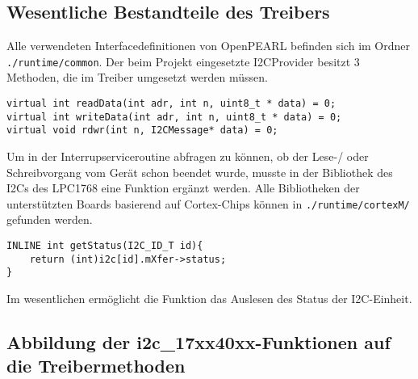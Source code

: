 \subsection{Wesentliche Bestandteile des Treibers}
Alle verwendeten Interfacedefinitionen von OpenPEARL befinden sich im Ordner \verb+./runtime/common+.
Der beim Projekt eingesetzte I2CProvider besitzt 3 Methoden, die im Treiber umgesetzt werden müssen.
\begin{verbatim}
virtual int readData(int adr, int n, uint8_t * data) = 0;
virtual int writeData(int adr, int n, uint8_t * data) = 0;
virtual void rdwr(int n, I2CMessage* data) = 0;
\end{verbatim}
Um in der Interrupserviceroutine abfragen zu können, ob der Lese-/ oder Schreibvorgang vom Gerät schon beendet wurde, musste in der Bibliothek des I2Cs des LPC1768 eine Funktion ergänzt werden. Alle Bibliotheken der unterstützten Boards basierend auf Cortex-Chips können in \verb+./runtime/cortexM/+ gefunden werden.
\begin{verbatim}
INLINE int getStatus(I2C_ID_T id){
	return (int)i2c[id].mXfer->status;
}
\end{verbatim}
Im wesentlichen ermöglicht die Funktion das Auslesen des Status der I2C-Einheit. 

\subsection{Abbildung der i2c\_17xx40xx-Funktionen auf die Treibermethoden}